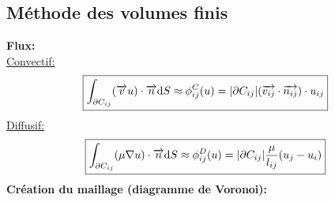 \subsection*{Méthode des volumes finis}
\textbf{Flux:}\\
\underline{Convectif:}
\begin{equation*}
    \boxed{\int_{\partial C_{ij}}(\overrightarrow{v}\space u)\cdot \overrightarrow{n}\space\mathrm{d}S\approx \phi_{ij}^C(u)=|\partial C_{ij}|(\overrightarrow{v_{ij}}\cdot\overrightarrow{n_{ij}})\cdot u_{ij}}
\end{equation*}
\underline{Diffusif:}
\begin{equation*}
    \boxed{\int_{\partial C_{ij}}(\mu \nabla u)\cdot \overrightarrow{n}\space\mathrm{d}S\approx \phi_{ij}^D(u)=|\partial C_{ij}|\frac{\mu}{l_{ij}}(u_j-u_i)}
\end{equation*}
\textbf{Création du maillage (diagramme de Voronoi):}\\
